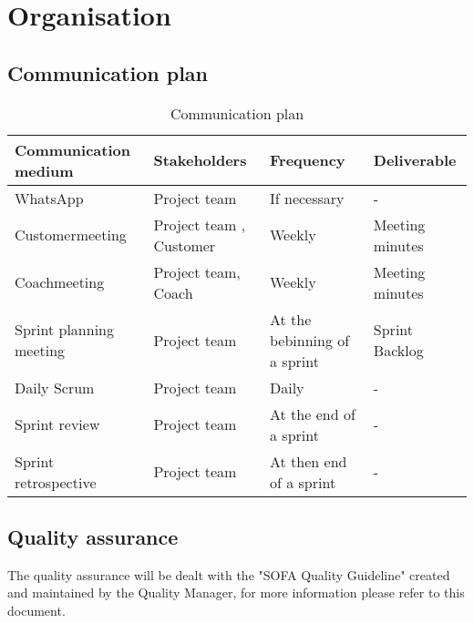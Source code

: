 \section{Organisation}

    \subsection{Communication plan}
    \begin{table}[H]
        \begin{tabularx}{\textwidth}{X X X X}
        	\hline
            \textbf{Communication medium} & \textbf{Stakeholders} & \textbf{Frequency} & \textbf{Deliverable} \\ \hline \hline
            WhatsApp & Project team & If necessary & - \\ \hline
            Customermeeting & Project team , Customer & Weekly & Meeting minutes \\ \hline
            Coachmeeting & Project team, Coach & Weekly & Meeting minutes \\ \hline
            Sprint planning meeting & Project team & At the bebinning of a sprint & Sprint Backlog \\ \hline
            Daily Scrum & Project team & Daily & - \\ \hline 
            Sprint review & Project team & At the end of a sprint & - \\ \hline
            Sprint retrospective & Project team & At then end of a sprint & - \\ \hline
        \end{tabularx}
        \caption{Communication plan}
    \end{table}

    \subsection{Quality assurance}
    The quality assurance will be dealt with the "SOFA Quality Guideline" created and maintained by the Quality Manager, for 
    more information please refer to this document.

